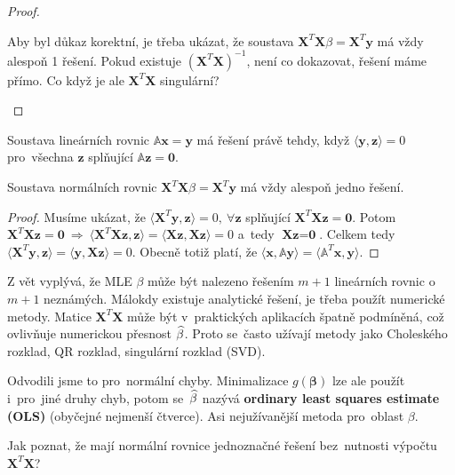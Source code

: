 \begin{theorem}
\begin{proof}
\begin{enumerate}[$\Rightarrow$]
 		 Aby byl důkaz korektní, je třeba ukázat, že soustava $\textbf{X}^T\textbf{X}\beta=\textbf{X}^T\textbf{y}$ má vždy alespoň 1 řešení. Pokud existuje $(\textbf{X}^T\textbf{X})^{-1}$, není co dokazovat, řešení máme přímo. Co když je ale $\textbf{X}^T\textbf{X}$ singulární?
 	\end{enumerate}
 	\end{proof}
 \end{theorem}
\begin{lemma}
	Soustava lineárních rovnic $\mathbb{A}\textbf{x}=\textbf{y}$ má řešení právě tehdy, když $\langle \textbf{y},\textbf{z}\rangle=0$ pro~všechna $\textbf{z}$ splňující $\mathbb{A}\textbf{z}=\textbf{0}$.
\end{lemma}
\begin{theorem}
	Soustava normálních rovnic $\textbf{X}^T\textbf{X}\beta=\textbf{X}^T\textbf{y}$ má vždy alespoň jedno řešení.
	\begin{proof}
		Musíme ukázat, že $\langle \textbf{X}^T\textbf{y},\textbf{z}\rangle=0,~\forall\textbf{z}$ splňující $\textbf{X}^T\textbf{X}\textbf{z}=\textbf{0}$. Potom
		$ \textbf{X}^T\textbf{X}\textbf{z}=\textbf{0}~\Rightarrow~ \langle \textbf{X}^T\textbf{X}\textbf{z},\textbf{z}\rangle=\langle \textbf{X}\textbf{z},\textbf{X}\textbf{z}\rangle=0$ a~tedy $\textbf{X}\textbf{z}=\textbf{0}$. Celkem tedy $\langle\textbf{X}^T\textbf{y},\textbf{z}\rangle=\langle\textbf{y},\textbf{X}\textbf{z}\rangle=0$. Obecně totiž platí, že $\langle \textbf{x},\mathbb{A}\textbf{y}\rangle=\langle \mathbb{A}^T\textbf{x},\textbf{y}\rangle$.
	\end{proof}
\end{theorem}
\begin{remark}
	Z vět vyplývá, že MLE $\beta$ může být nalezeno řešením $m+1$ lineárních rovnic o~$m+1$ neznámých. Málokdy existuje analytické řešení, je třeba použít numerické metody. Matice $\textbf{X}^T\textbf{X}$ může být v~praktických aplikacích špatně podmíněná, což ovlivňuje numerickou přesnost $\widehat{\beta}$. Proto se~často užívají metody jako Choleského rozklad, QR rozklad, singulární rozklad (SVD).
	
	Odvodili jsme to pro~normální chyby. Minimalizace $g(\boldsymbol{\beta})$ lze ale použít i~pro~jiné druhy chyb, potom se~$\widehat{\beta}$ nazývá \textbf{ordinary least squares estimate (OLS)} (obyčejné nejmenší čtverce). Asi nejužívanější metoda  pro~oblast $\beta$. 
	
	Jak poznat, že mají normální rovnice jednoznačné řešení bez~nutnosti výpočtu $\textbf{X}^T\textbf{X}$?
\end{remark}
